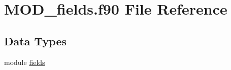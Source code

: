 \hypertarget{MOD__fields_8f90}{\section{M\-O\-D\-\_\-fields.\-f90 File Reference}
\label{MOD__fields_8f90}
}
\subsection*{Data Types}
\begin{DoxyCompactItemize}
\item 
module \hyperlink{classfields}{fields}
\end{DoxyCompactItemize}
